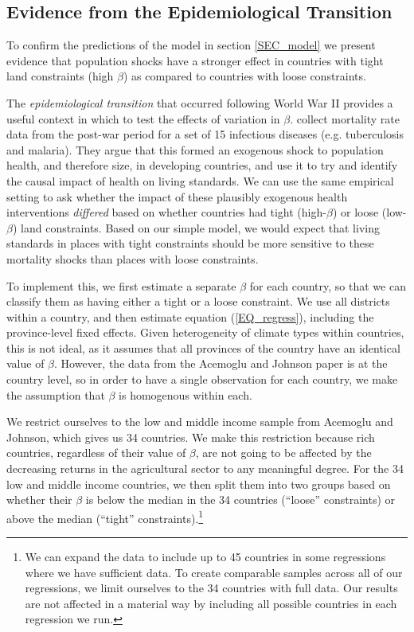 \documentclass[11pt]{article}
\begin{document}
\subsection{Evidence from the Epidemiological Transition}\label{SEC_ajtest}
To confirm the predictions of the model in section \ref{SEC_model} we present evidence that population shocks have a stronger effect in countries with tight land constraints (high $\beta$) as compared to countries with loose constraints.

The \textit{epidemiological transition} that occurred following World War II provides a useful context in which to test the effects of variation in $\beta$. \cite{aj07} collect mortality rate data from the post-war period for a set of 15 infectious diseases (e.g. tuberculosis and malaria). They argue that this formed an exogenous shock to population health, and therefore size, in developing countries, and use it to try and identify the causal impact of health on living standards. We can use the same empirical setting to ask whether the impact of these plausibly exogenous health interventions \textit{differed} based on whether countries had tight (high-$\beta$) or loose (low-$\beta$) land constraints. Based on our simple model, we would expect that living standards in places with tight constraints should be more sensitive to these mortality shocks than places with loose constraints.

To implement this, we first estimate a separate $\beta$ for each country, so that we can classify them as having either a tight or a loose constraint. We use all districts within a country, and then estimate equation (\ref{EQ_regress}), including the province-level fixed effects. Given heterogeneity of climate types within countries, this is not ideal, as it assumes that all provinces of the country have an identical value of $\beta$. However, the data from the Acemoglu and Johnson paper is at the country level, so in order to have a single observation for each country, we make the assumption that $\beta$ is homogenous within each.

We restrict ourselves to the low and middle income sample from Acemoglu and Johnson, which gives us 34 countries. We make this restriction because rich countries, regardless of their value of $\beta$, are not going to be affected by the decreasing returns in the agricultural sector to any meaningful degree. For the 34 low and middle income countries, we then split them into two groups based on whether their $\beta$ is below the median in the 34 countries (``loose'' constraints) or above the median (``tight'' constraints).\footnote{We can expand the data to include up to 45 countries in some regressions where we have sufficient data. To create comparable samples across all of our regressions, we limit ourselves to the 34 countries with full data. Our results are not affected in a material way by including all possible countries in each regression we run.}
\end{document}
